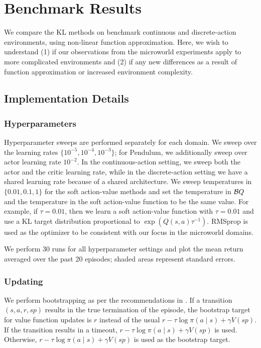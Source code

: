\documentclass[\main/thesis.tex]{subfiles}
\begin{document}
\chapter{Benchmark Results}

We compare the KL methods on benchmark continuous and discrete-action environments, using non-linear function approximation. Here, we wish to understand (1) if our observations from the microworld experiments apply to more complicated environments and (2) if any new differences as a result of function approximation or increased environment complexity. 

\section{Implementation Details}
\subsection{Hyperparameters}
Hyperparameter sweeps are performed separately for each domain. We sweep over the learning rates $\{10^{-5}, 10^{-4}, 10^{-3}\}$; for Pendulum, we additionally sweep over actor learning rate $10^{-2}$. In the continuous-action setting, we sweep both the actor and the critic learning rate, while in the discrete-action setting we have a shared learning rate because of a shared architecture. We sweep temperatures in $\{0.01, 0.1, 1\}$ for the soft action-value methods and set the temperature in $\mathcal{B}Q$ and the temperature in the soft action-value function to be the same value. For example, if $\tau = 0.01$, then we learn a soft action-value function with $\tau = 0.01$ and use a KL target distribution proportional to $\exp(Q(s, a) \tau^{-1})$. RMSprop \citep{tieleman2012lecture} is used as the optimizer to be consistent with our focus in the microworld domains. 

We perform 30 runs for all hyperparameter settings and plot the mean return averaged over the past 20 episodes; shaded areas represent standard errors. 


\subsection{Updating}
We perform bootstrapping as per the recommendations in \citet{pardo2017time}. If a transition $(s, a, r, sp)$ results in the true termination of the episode, the bootstrap target for value function updates is $r$ instead of the usual $r - \tau \log \pi(a \mid s) + \gamma V(sp)$. If the transition results in a timeout, $r - \tau \log \pi(a \mid s) + \gamma V(sp)$ is used. Otherwise, $r - \tau \log \pi(a \mid s) + \gamma V(sp)$ is used as the bootstrap target. 
\end{document}
